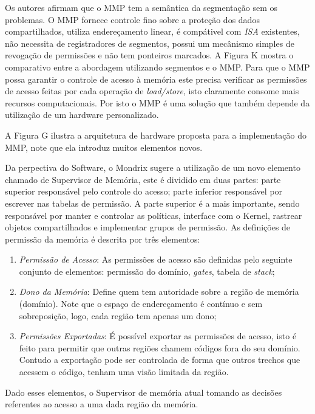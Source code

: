 
Os autores afirmam que o MMP tem a semântica da segmentação sem os problemas. O
MMP fornece controle fino sobre a proteção dos dados compartilhados, utiliza
endereçamento linear, é compátivel com \emph{ISA} existentes, não necessita de
registradores de segmentos, possui um mecânismo simples de revogação de
permissões e não tem ponteiros marcados. A Figura K mostra o comparativo entre
a abordagem utilizando segmentos e o MMP. Para que o MMP possa garantir o
controle de acesso à memória este precisa verificar as permissões de acesso
feitas por cada operação de \emph{load/store}, isto claramente consome mais
recursos computacionais. Por isto o MMP é uma solução que também depende da
utilização de um hardware personalizado.


A Figura G ilustra a arquitetura de hardware proposta para a implementação do
MMP, note que ela introduz muitos elementos novos. %

Da perpectiva do Software, o Mondrix \citep{mondrix} sugere a utilização de um
novo elemento chamado de Supervisor de Memória, este é dividido em duas partes:
parte superior responsável pelo controle do acesso; parte inferior responsável
por escrever nas tabelas de permissão. A parte superior é a mais importante,
sendo responsável por manter e controlar as políticas, interface com o Kernel,
rastrear objetos compartilhados e implementar grupos de permissão. As
definições de permissão da memória é descrita por três elementos:
\begin{enumerate}
	\item \emph{Permissão de Acesso}: As permissões de acesso são definidas pelo
				seguinte conjunto de elementos: permissão do domínio, \emph{gates},
        tabela de \emph{stack};
	\item \emph{Dono da Memória}: Define quem tem autoridade sobre a região de
				memória (domínio). Note que o espaço de endereçamento é contínuo e sem
				sobreposição, logo, cada região tem apenas um dono;
	\item \emph{Permissões Exportadas}: É possível exportar as permissões de
				acesso, isto é feito para permitir que outras regiões chamem códigos
				fora do seu domínio. Contudo a exportação pode ser controlada de forma
				que outros trechos que acessem o código, tenham uma visão limitada da
				região.
\end{enumerate}
Dado esses elementos, o Supervisor de memória atual tomando as decisões
referentes ao acesso a uma dada região da memória.

